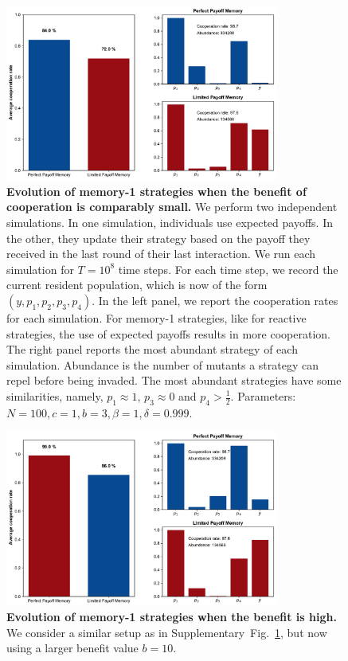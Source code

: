 \documentclass[11pt]{article}
\theoremstyle{plainCl1}
\theoremstyle{plainCl2}
\begin{document}
\begin{figure}[t!]
  \centering 
  \includegraphics[width=0.8\textwidth]{static/memory_one_results_low_benefit.pdf}
  \caption{\textbf{Evolution of memory-1 strategies when the benefit of cooperation is comparably small.}
  We perform two independent simulations. In one simulation, individuals use
  expected payoffs. 
  In the other, they update their strategy based on the payoff they received in the last round of their last interaction. 
  We run each simulation for \(T = 10^8\) time steps.
  For each time step, we record the current resident population, which is
  now of the form  \((y, p_1, p_2, p_3, p_4)\). In the left panel, we report the
  cooperation rates for each simulation. 
  For memory-1 strategies, like for reactive strategies, the use of expected payoffs results in more cooperation. 
  The right panel reports the most abundant strategy of each
  simulation. Abundance is the number of mutants a strategy can repel before
  being invaded. The most abundant strategies have some similarities,
  namely, \(p_1 \approx 1\), \(p_3 \approx 0\) and \(p_4 > \frac{1}{2}\). 
  Parameters: \(N =100, c=1, b=3, \beta=1, \delta=0.999\).}\label{fig:memory_one_low_benefit}
\end{figure}


\begin{figure}[t!]
  \centering 
  \includegraphics[width=0.8\textwidth]{static/memory_one_results_high_benefit.pdf}
  \caption{\textbf{Evolution of memory-1 strategies when the benefit is high.}
  We consider a similar setup as in Supplementary~Fig.~\ref{fig:memory_one_low_benefit}, but now using a larger benefit value $b\!=\!10$.}\label{fig:memory_one_high_benefit}
\end{figure}
\end{document}

